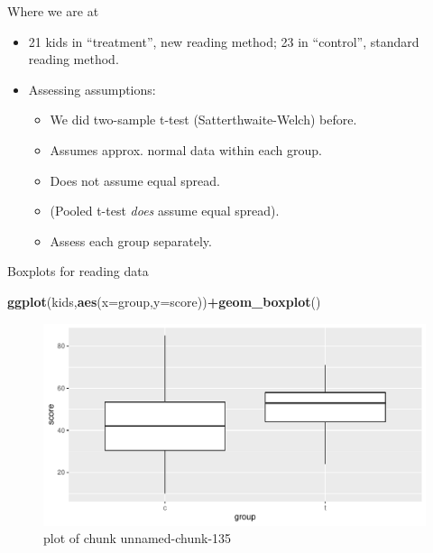 \documentclass[ignorenonframetext,]{beamer}
\newenvironment{Shaded}{\begin{snugshade}}{\end{snugshade}}
\newcommand{\DataTypeTok}[1]{\textcolor[rgb]{0.13,0.29,0.53}{#1}}
\newcommand{\KeywordTok}[1]{\textcolor[rgb]{0.13,0.29,0.53}{\textbf{#1}}}
\newcommand{\NormalTok}[1]{#1}
\newcommand{\OperatorTok}[1]{\textcolor[rgb]{0.81,0.36,0.00}{\textbf{#1}}}
\providecommand{\tightlist}{%
  \setlength{\itemsep}{0pt}\setlength{\parskip}{0pt}}
\begin{document}
\begin{frame}{Where we are at}
\protect\hypertarget{where-we-are-at}{}

\begin{itemize}
\item
  21 kids in ``treatment'', new reading method; 23 in ``control'',
  standard reading method.
\item
  Assessing assumptions:

  \begin{itemize}
  \tightlist
  \item
    We did two-sample t-test (Satterthwaite-Welch) before.
  \item
    Assumes approx. normal data within each group.
  \item
    Does not assume equal spread.
  \item
    (Pooled t-test \emph{does} assume equal spread).
  \item
    Assess each group separately.
  \end{itemize}
\end{itemize}

\end{frame}

\begin{frame}[fragile]{Boxplots for reading data}
\protect\hypertarget{boxplots-for-reading-data}{}

\begin{Shaded}
\begin{Highlighting}[]
\KeywordTok{ggplot}\NormalTok{(kids,}\KeywordTok{aes}\NormalTok{(}\DataTypeTok{x=}\NormalTok{group,}\DataTypeTok{y=}\NormalTok{score))}\OperatorTok{+}\KeywordTok{geom_boxplot}\NormalTok{()}
\end{Highlighting}
\end{Shaded}

\begin{figure}
\centering
\includegraphics{figure/unnamed-chunk-135-1.pdf}
\caption{plot of chunk unnamed-chunk-135}
\end{figure}

\end{frame}
\end{document}
